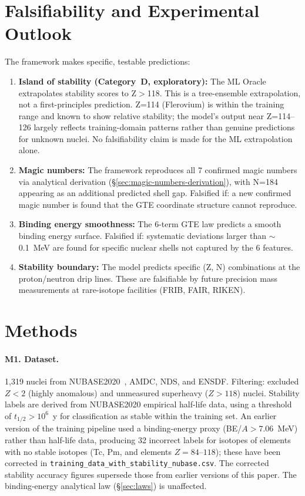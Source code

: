 \documentclass[9pt,twocolumn]{extarticle}
\begin{document}
\section{Falsifiability and Experimental Outlook}

The framework makes specific, testable predictions:

\begin{enumerate}[nosep]
\item \textbf{Island of stability (Category~D, exploratory):} The ML Oracle extrapolates stability scores to Z$>$118. This is a tree-ensemble extrapolation, not a first-principles prediction. Z=114 (Flerovium) is within the training range and known to show relative stability; the model's output near Z=114--126 largely reflects training-domain patterns rather than genuine predictions for unknown nuclei. No falsifiability claim is made for the ML extrapolation alone.

\item \textbf{Magic numbers:} The framework reproduces all 7 confirmed magic numbers via analytical derivation (\S\ref{sec:magic-numbers-derivation}), with N=184 appearing as an additional predicted shell gap. Falsified if: a new confirmed magic number is found that the GTE coordinate structure cannot reproduce.

\item \textbf{Binding energy smoothness:} The 6-term GTE law predicts a smooth binding energy surface. Falsified if: systematic deviations larger than $\sim$0.1~MeV are found for specific nuclear shells not captured by the 6 features.

\item \textbf{Stability boundary:} The model predicts specific (Z, N) combinations at the proton/neutron drip lines. These are falsifiable by future precision mass measurements at rare-isotope facilities (FRIB, FAIR, RIKEN).
\end{enumerate}

\section*{Methods}

\paragraph{M1. Dataset.} 1,319 nuclei from NUBASE2020~\cite{Kondev2021}, AMDC, NDS, and ENSDF. Filtering: excluded $Z<2$ (highly anomalous) and unmeasured superheavy ($Z>118$) nuclei. Stability labels are derived from NUBASE2020 empirical half-life data, using a threshold of $t_{1/2} > 10^6$~y for classification as stable within the training set. An earlier version of the training pipeline used a binding-energy proxy (BE/$A > 7.06$~MeV) rather than half-life data, producing 32 incorrect labels for isotopes of elements with no stable isotopes (Tc, Pm, and elements $Z=84$--$118$); these have been corrected in \texttt{training\_data\_with\_stability\_nubase.csv}. The corrected stability accuracy figures supersede those from earlier versions of this paper. The binding-energy analytical law (\S\ref{sec:laws}) is unaffected.
\end{document}
